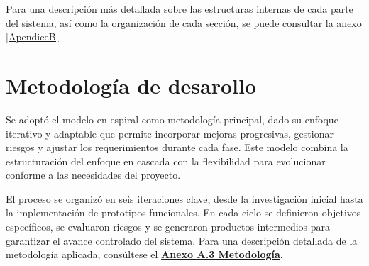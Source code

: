 Para una descripción más detallada sobre las estructuras internas de cada parte del sistema, así como la organización de cada sección, se puede consultar la anexo \ref{ApendiceB}




\section{Metodología de desarollo}
Se adoptó el modelo en espiral como metodología principal, dado su enfoque iterativo y adaptable que permite incorporar mejoras progresivas, gestionar riesgos y ajustar los requerimientos durante cada fase. Este modelo combina la estructuración del enfoque en cascada con la flexibilidad para evolucionar conforme a las necesidades del proyecto.

El proceso se organizó en seis iteraciones clave, desde la investigación inicial hasta la implementación de prototipos funcionales. En cada ciclo se definieron objetivos específicos, se evaluaron riesgos y se generaron productos intermedios para garantizar el avance controlado del sistema. Para una descripción detallada de la metodología aplicada, consúltese el \hyperref[cap:Meto]{\textbf{Anexo A.3 Metodología}}.
